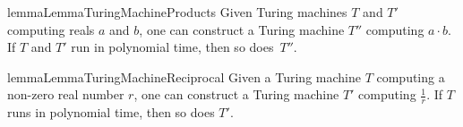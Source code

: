 \begin{restatable}{lemma}{LemmaTuringMachineProducts}
  \label{lemma:turing-machine-products}
  Given Turing machines $T$ and $T'$ computing reals $a$ and $b$,
  one can construct a Turing machine $T''$ computing $a \cdot b$.
  If $T$ and $T'$ run in polynomial time, then so does~$T''$.
\end{restatable}
\vspace{-8pt}
\begin{restatable}{lemma}{LemmaTuringMachineReciprocal}
  \label{lemma:turing-machine-reciprocal}
  Given a Turing machine $T$ computing a non-zero real number $r$,
  one can construct a Turing machine $T'$ computing $\frac{1}{r}$. 
  If $T$ runs in polynomial time, then so does $T'$.
\end{restatable}




